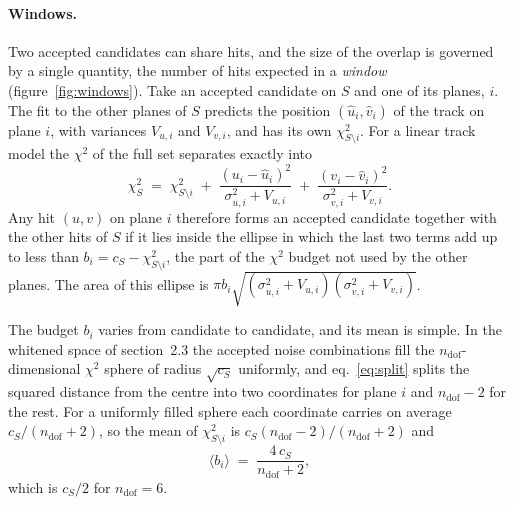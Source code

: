 \documentclass[a4paper,11pt]{article}
\newcommand{\ndof}{n_\mathrm{dof}}
\begin{document}
\paragraph{Windows.} Two accepted candidates can share hits, and the size of the overlap is
governed by a single quantity, the number of hits expected in a \emph{window}
(figure~\ref{fig:windows}). Take an accepted candidate on $S$ and one of its planes, $i$. The
fit to the other planes of $S$ predicts the position $(\hat u_i,\hat v_i)$ of the track on plane
$i$, with variances $V_{u,i}$ and $V_{v,i}$, and has its own $\chi^2_{S\setminus i}$. For a
linear track model the $\chi^2$ of the full set separates exactly into
\begin{equation}
  \chi^2_S \;=\; \chi^2_{S\setminus i} \;+\; \frac{(u_i-\hat u_i)^2}{\sigma_{u,i}^2+V_{u,i}}
  \;+\; \frac{(v_i-\hat v_i)^2}{\sigma_{v,i}^2+V_{v,i}} .
  \label{eq:split}
\end{equation}
Any hit $(u,v)$ on plane $i$ therefore forms an accepted candidate together with the other
hits of $S$ if it lies inside the ellipse in which the last two terms add up to less than
$b_i=c_S-\chi^2_{S\setminus i}$, the part of the $\chi^2$ budget not used by the other planes.
The area of this ellipse is $\pi b_i\sqrt{(\sigma_{u,i}^2+V_{u,i})(\sigma_{v,i}^2+V_{v,i})}$.

The budget $b_i$ varies from candidate to candidate, and its mean is simple. In the whitened
space of section~2.3 the accepted noise combinations fill the $\ndof$-dimensional $\chi^2$
sphere of radius $\sqrt{c_S}$ uniformly, and eq.~\eqref{eq:split} splits the squared distance
from the centre into two coordinates for plane $i$ and $\ndof-2$ for the rest. For a uniformly
filled sphere each coordinate carries on average $c_S/(\ndof+2)$, so the mean of
$\chi^2_{S\setminus i}$ is $c_S(\ndof-2)/(\ndof+2)$ and
\begin{equation}
  \langle b_i\rangle \;=\; \frac{4\,c_S}{\ndof+2} ,
  \label{eq:budget}
\end{equation}
which is $c_S/2$ for $\ndof=6$.
\end{document}
